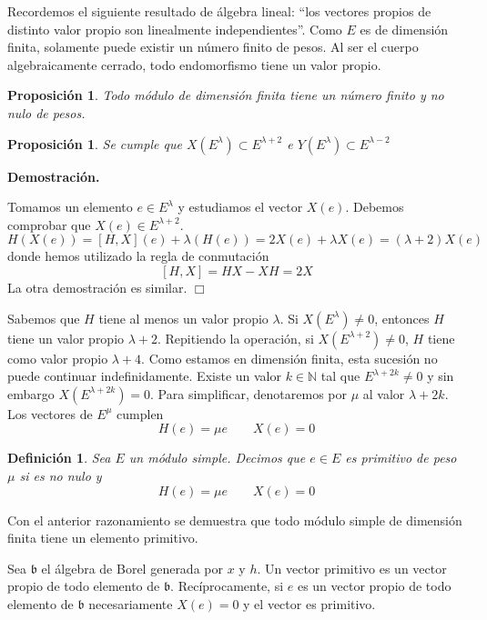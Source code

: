 \documentclass[a4paper,draft,12pt]{scrartcl}
\newtheorem{defi}{Definición}[section]%
\newtheorem{propo}[teo]{Proposición}%
\newcommand{\dem}{\noindent \textbf{Demostración. }\vspace{0.3 cm}}%
\newcommand{\N}{\mathbb{N}}%
\newcommand{\fin}{ $\Box $ \vspace{0.4 cm}}
\newcommand{\df}[1]{\textsf{\color{blue}#1}}
\begin{document}
Recordemos el siguiente resultado de álgebra lineal:  ``los vectores propios de distinto valor propio son linealmente independientes''.  Como  $E$ es de dimensión finita, solamente puede existir un número finito de pesos.  Al ser el cuerpo algebraicamente cerrado, todo endomorfismo tiene un valor propio.

\begin{propo}

Todo módulo de dimensión finita tiene un número  finito y no nulo de pesos.

\end{propo}


\begin{propo}

Se cumple que $X(E^\lambda)\subset E^{\lambda+2}$ e $Y(E^\lambda) \subset E^{\lambda-2}$

\end{propo}

\dem

Tomamos un elemento $e \in E^\lambda$ y estudiamos el vector $X(e)$.  Debemos comprobar que $X(e) \in E^{\lambda+2}$.
$$
H(X(e))= [H,X](e)+\lambda(H(e))= 2X(e)+\lambda X(e)= (\lambda+2) X(e)
$$
donde hemos utilizado la regla de conmutación
$$
[H,X]= HX-XH=2X
$$
La otra demostración es similar. \fin

Sabemos que $H$ tiene al menos un valor propio $\lambda$. Si $X(E^\lambda)\neq 0$, entonces $H$ tiene un valor propio $\lambda +2$.  Repitiendo la operación, si $X(E^{\lambda+2}) \neq 0$, $H$ tiene como valor propio $\lambda +4$. Como estamos en dimensión finita, esta sucesión no puede continuar indefinidamente. Existe un valor $k \in \N$ tal que $E^{\lambda+2k} \neq 0$ y sin embargo $X(E^{\lambda+2k})=0$.  Para simplificar, denotaremos por $\mu$ al valor  $\lambda +2k$.  Los vectores de $E^\mu$ cumplen
$$
H(e)=\mu e\qquad X(e)=0
$$

\begin{defi}

Sea $E$ un módulo simple.  Decimos que $e \in E $ es  \df{primitivo} de peso $\mu$ si es no nulo y 
$$
H(e)= \mu e \qquad X(e)=0
$$

\end{defi}

Con el anterior razonamiento se demuestra que todo módulo simple de dimensión finita tiene un elemento primitivo.

\bigskip


Sea $\mathfrak{b}$ el álgebra de Borel generada por $x$ y $h$.  Un vector primitivo es un vector propio de todo elemento de $\mathfrak{b}$.  Recíprocamente, si $e $ es un vector propio de todo elemento de $\mathfrak{b}$ necesariamente $X(e)=0$ y el vector es primitivo.
\end{document}
